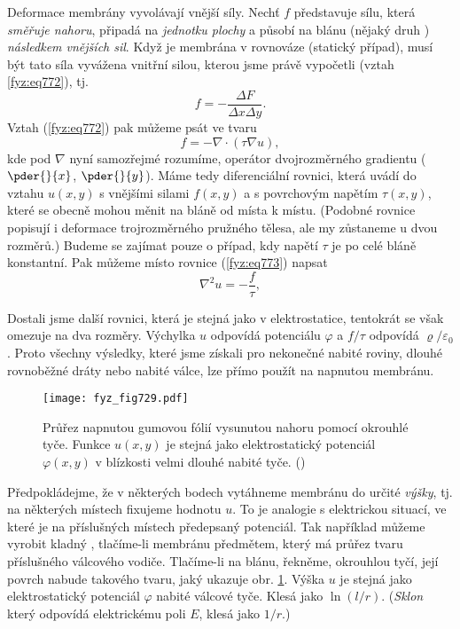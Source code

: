     Deformace membrány vyvolávají vnější síly. Nechť \(f\) představuje sílu, která \emph{směřuje
    nahoru}, připadá na \emph{jednotku plochy} a působí na blánu (nějaký druh )
    \emph{následkem vnějších sil}. Když je membrána v rovnováze (statický případ), musí být tato
    síla vyvážena vnitřní silou, kterou jsme právě vypočetli (vztah \ref{fyz:eq772}), tj.
    \begin{equation*}
      f = -\dfrac{\Delta F}{\Delta x\Delta y}.
    \end{equation*}
    Vztah (\ref{fyz:eq772}) pak můžeme psát ve tvaru
    \begin{equation}\label{fyz:eq773}
      f = -\nabla\cdot(\tau\nabla u),
    \end{equation}   
    kde pod \(\nabla\) nyní samozřejmé rozumíme, operátor dvojrozměrného gradientu (\(\pder{}{x}\),
    \(\pder{}{y}\)). Máme tedy diferenciální rovnici, která uvádí do vztahu \(u(x, y)\) s vnějšími
    silami \(f(x, y)\) a s povrchovým napětím \(\tau(x, y)\), které se obecně mohou měnit na bláně
    od místa k místu. (Podobné rovnice popisují i deformace trojrozměrného pružného tělesa, ale my
    zůstaneme u dvou rozměrů.) Budeme se zajímat pouze o případ, kdy napětí \(\tau\) je po celé
    bláně konstantní. Pak můžeme místo rovnice (\ref{fyz:eq773}) napsat
    \begin{equation}\label{fyz:eq774}
      \nabla^2u = -\dfrac{f}{\tau},
    \end{equation}   

    Dostali jsme další rovnici, která je stejná jako v elektrostatice, tentokrát se však omezuje na
    dva rozměry. Výchylka \(u\) odpovídá potenciálu \(\varphi\) a \(f/\tau\) odpovídá
    \(\varrho/\varepsilon_0\). Proto všechny výsledky, které jsme získali pro nekonečné nabité
    roviny, dlouhé rovnoběžné dráty nebo nabité válce, lze přímo použít na napnutou membránu.

    \begin{figure}[ht!] %
      \centering
      \texttt{[image: fyz\_fig729.pdf]}
      \caption{Průřez napnutou gumovou fólií vysunutou nahoru pomocí okrouhlé tyče. Funkce \(u(x,
        y)\) je stejná jako elektrostatický potenciál \(\varphi(x, y)\) v blízkosti velmi dlouhé
        nabité tyče. (\cite[s.~213]{Feynman02})}
      \label{fyz:fig729}
    \end{figure}

    Předpokládejme, že v některých bodech vytáhneme membránu do určité \emph{výšky}, tj. na
    některých místech fixujeme hodnotu \(u\). To je analogie s elektrickou situací, ve které je na
    příslušných místech předepsaný potenciál. Tak například můžeme vyrobit kladný ,
    tlačíme-li membránu předmětem, který má průřez tvaru příslušného válcového vodiče. Tlačíme-li na
    blánu, řekněme, okrouhlou tyčí, její povrch nabude takového tvaru, jaký ukazuje obr.
    \ref{fyz:fig729}. Výška \(u\) je stejná jako elektrostatický potenciál \(\varphi\) nabité
    válcové tyče. Klesá jako \(\ln(l/r)\). (\emph{Sklon} který odpovídá elektrickému poli \(E\),
    klesá jako \(1/r\).)

